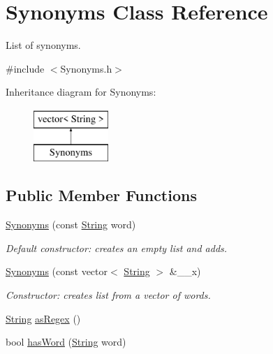 \hypertarget{classSynonyms}{}\section{Synonyms Class Reference}
\label{classSynonyms}


List of synonyms.  




{\ttfamily \#include $<$Synonyms.\+h$>$}

Inheritance diagram for Synonyms\+:\begin{figure}[H]
\begin{center}
\leavevmode
\includegraphics[height=2.000000cm]{classSynonyms}
\end{center}
\end{figure}
\subsection*{Public Member Functions}
\begin{DoxyCompactItemize}
\item 
\mbox{\hyperlink{classSynonyms_ac3bc326580cfe3de1bab88d71e5dcaed}{Synonyms}} (const \mbox{\hyperlink{classString}{String}} word)
\begin{DoxyCompactList}\small\item\em Default constructor\+: creates an empty list and adds. \end{DoxyCompactList}\item 
\mbox{\label{classSynonyms_adfe3753a58fa0eb1d4b2409351f040c4}} 
\mbox{\hyperlink{classSynonyms_adfe3753a58fa0eb1d4b2409351f040c4}{Synonyms}} (const vector$<$ \mbox{\hyperlink{classString}{String}} $>$ \&\+\_\+\+\_\+x)
\begin{DoxyCompactList}\small\item\em Constructor\+: creates list from a vector of words. \end{DoxyCompactList}\item 
\mbox{\hyperlink{classString}{String}} \mbox{\hyperlink{classSynonyms_abe26e020a2d097a225bc0527253d9c63}{as\+Regex}} ()
\item 
bool \mbox{\hyperlink{classSynonyms_a36ffe85c896f9293626deab7d6517b51}{has\+Word}} (\mbox{\hyperlink{classString}{String}} word)
\end{DoxyCompactItemize}
